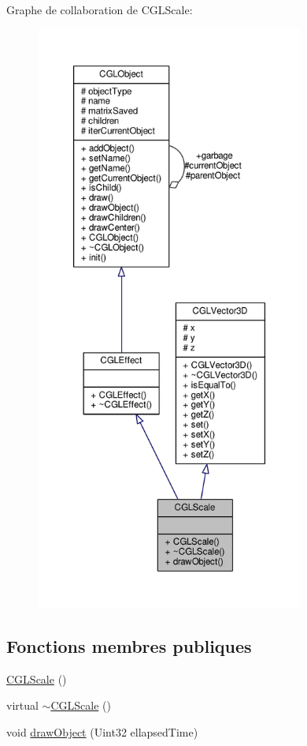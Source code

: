 Graphe de collaboration de C\-G\-L\-Scale\-:\nopagebreak
\begin{figure}[H]
\begin{center}
\leavevmode
\includegraphics[height=550pt]{dd/d3a/class_c_g_l_scale__coll__graph}
\end{center}
\end{figure}
\subsection*{Fonctions membres publiques}
\begin{DoxyCompactItemize}
\item 
\hyperlink{class_c_g_l_scale_a48ed3886215e1ee3ae43fedae36cf426}{C\-G\-L\-Scale} ()
\item 
virtual \hyperlink{class_c_g_l_scale_a8a084fe6407bc5226723dd6300089cce}{$\sim$\-C\-G\-L\-Scale} ()
\item 
void \hyperlink{class_c_g_l_scale_a27939db2fb5f900800f391bb06a387a4}{draw\-Object} (Uint32 ellapsed\-Time)
\end{DoxyCompactItemize}
